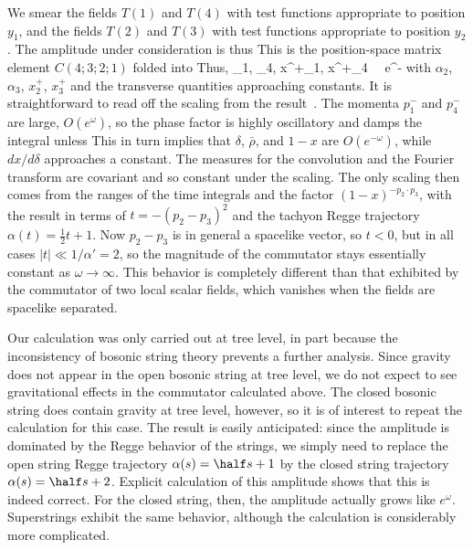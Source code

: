 We smear the fields $T(1)$ and $T(4)$ with test functions appropriate
to position $y_1$, and the fields $T(2)$ and $T(3)$ with test
functions appropriate to position $y_2$.  The amplitude under
consideration is thus
\eqn{}
This is the position-space matrix element $C(4;3;2;1)$ folded into
\eqn{}
Thus,
\eqn\small{
\alpha_1, \alpha_4, x^+_1, x^+_4 \ \propto\
e^{-\omega}
}
with $\alpha_{2}$, $\alpha_{3}$, $x^+_{2}$,
$x^+_{3}$ and the
transverse quantities approaching constants.  It is straightforward
to read
off the scaling from the result~\confin.  The momenta $p^-_1$ and
$p^-_4$
are large, $O(e^{\omega})$, so the phase factor is highly oscillatory
and
damps the integral unless
\eqn\smtimes{
x'^+ - x_4^+ = O(e^{-\omega}), \qquad x''^+ - x_1^+ = O(e^{-\omega})
}
This in turn implies that $\delta$, $\bar\rho$, and $1-x$ are
$O(e^{-\omega})$, while $dx/d\delta$ approaches a constant.  The
measures
for the convolution and the Fourier transform are covariant and so
constant under the scaling.  The only scaling then comes from the
ranges of
the time integrals and the factor $(1-x)^{-p_2 \cdot p_3}$, with the
result
\eqn{}
in terms of $t = -(p_2 - p_3)^2$ and the tachyon Regge trajectory
$\alpha(t) = \frac{1}{2}t + 1$.
Now $p_2 - p_3$ is in general a spacelike vector, so $t < 0$, but in
all cases $|t| \ll 1/\alpha'=2$, so the magnitude of the commutator
stays essentially constant as $\omega \rightarrow \infty$.  This
behavior is completely different than that exhibited by the
commutator of two local scalar fields, which vanishes when the
fields are spacelike separated.


Our calculation was only carried out at tree level, in part
because the inconsistency of bosonic string theory prevents a
further analysis.  Since gravity does not appear in the open
bosonic string at tree level, we do not expect to see gravitational
effects in the commutator calculated above.  The closed bosonic
string does contain gravity at tree level, however, so it is of
interest to repeat the calculation for this case.
The
result is easily anticipated: since the amplitude is
dominated by the Regge behavior of the strings, we simply need to
replace the open string Regge trajectory $\alpha(s) = \half s + 1$ by
the closed string trajectory $\alpha(s) = \half s + 2$.  Explicit
calculation of this amplitude shows that this is indeed correct.
For the closed string, then,
the amplitude actually grows like $e^{\omega}$.  Superstrings exhibit
the same behavior, although the calculation is considerably
more complicated.

